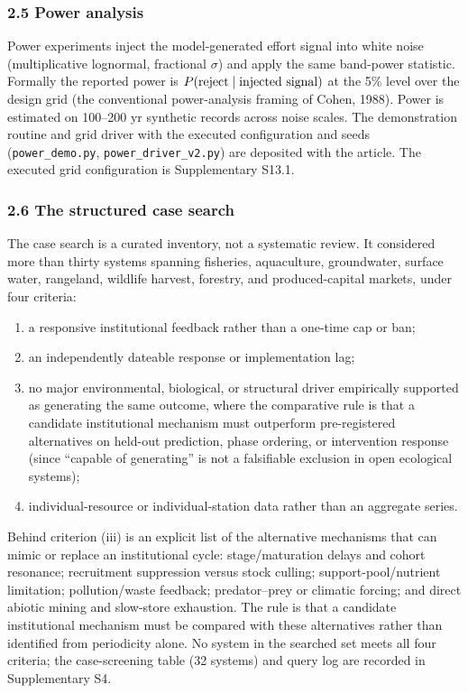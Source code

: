 \documentclass[11pt]{article}
\providecommand{\tightlist}{\setlength{\itemsep}{0pt}\setlength{\parskip}{0pt}}
\begin{document}
\subsubsection{2.5 Power analysis}\label{power-analysis}

Power experiments inject the model-generated effort signal into
white noise (multiplicative lognormal, fractional \(\sigma\)) and apply the same band-power statistic. Formally the reported power is \(P({\rm reject}\mid{\rm injected\ signal})\) at the 5\% level over the design grid (the conventional power-analysis framing of Cohen, 1988). Power is estimated
on 100--200 yr synthetic records across noise scales. The demonstration
routine and grid driver with the executed configuration and seeds
(\texttt{power\_demo.py}, \texttt{power\_driver\_v2.py}) are deposited
with the article. The executed grid configuration is Supplementary S13.1.

\subsubsection{2.6 The structured case
search}\label{the-structured-case-search}

The case search is a curated inventory, not a systematic review.
It considered more than thirty systems spanning fisheries, aquaculture,
groundwater, surface water, rangeland, wildlife harvest, forestry, and
produced-capital markets, under four criteria:

\begin{enumerate}
\def\labelenumi{(\roman{enumi})}
\tightlist
\item
  a responsive institutional feedback rather than a one-time cap or ban;
\item
  an independently dateable response or implementation lag;
\item
  no major environmental, biological, or structural driver empirically
  supported as generating the same outcome, where the comparative rule
  is that a candidate institutional mechanism must outperform
  pre-registered alternatives on held-out prediction, phase ordering, or
  intervention response (since ``capable of generating'' is not a
  falsifiable exclusion in open ecological systems);
\item
  individual-resource or individual-station data rather than an
  aggregate series.
\end{enumerate}

Behind criterion (iii) is an explicit list of the alternative
mechanisms that can mimic or replace an institutional cycle:
stage/maturation delays and cohort resonance; recruitment suppression
versus stock culling; support-pool/nutrient limitation; pollution/waste
feedback; predator--prey or climatic forcing; and direct abiotic mining
and slow-store exhaustion. The rule is that a candidate institutional
mechanism must be compared with these alternatives rather than
identified from periodicity alone. No system in the searched set meets all four criteria; the case-screening table (32 systems) and query log are recorded in Supplementary S4.
\end{document}

